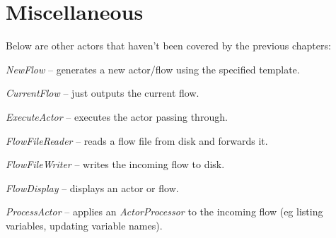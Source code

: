 \documentclass[a4paper]{book}
\begin{document}
\chapter{Miscellaneous}
Below are other actors that haven't been covered by the previous chapters:
\begin{tight_itemize}
  \item \textit{NewFlow} -- generates a new actor/flow using the specified
  template.
  \item \textit{CurrentFlow} -- just outputs the current flow.
  \item \textit{ExecuteActor} -- executes the actor passing through.
  \item \textit{FlowFileReader} -- reads a flow file from disk and forwards it.
  \item \textit{FlowFileWriter} -- writes the incoming flow to disk.
  \item \textit{FlowDisplay} -- displays an actor or flow.
  \item \textit{ProcessActor} -- applies an \textit{ActorProcessor} to the
  incoming flow (eg listing variables, updating variable names).
\end{tight_itemize}


\end{document}
